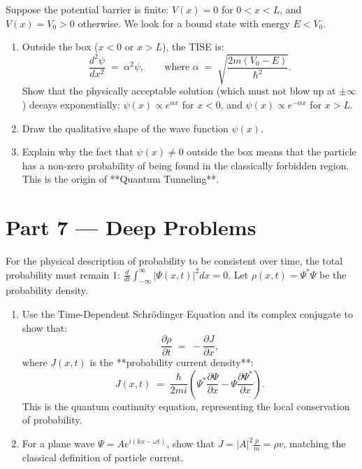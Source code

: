 \documentclass[12pt, a4paper, twoside]{book}
\newcounter{problem}[chapter]
\begin{document}
\begin{problem}
Suppose the potential barrier is finite: $V(x) = 0$ for $0 < x < L$, and $V(x) = V_0 > 0$ otherwise. We look for a bound state with energy $E < V_0$.
\begin{enumerate}[label=(\alph*)]
  \item Outside the box ($x < 0$ or $x > L$), the TISE is:
  \[
    \frac{d^2 \psi}{dx^2} \;=\; \alpha^2 \psi, \qquad \text{where } \alpha \;=\; \sqrt{\frac{2m(V_0 - E)}{\hbar^2}}.
  \]
  Show that the physically acceptable solution (which must not blow up at $\pm\infty$) decays exponentially: $\psi(x) \propto e^{\alpha x}$ for $x < 0$, and $\psi(x) \propto e^{-\alpha x}$ for $x > L$.
  \item Draw the qualitative shape of the wave function $\psi(x)$.
  \item Explain why the fact that $\psi(x) \neq 0$ outside the box means that the particle has a non-zero probability of being found in the classically forbidden region. This is the origin of **Quantum Tunneling**.
\end{enumerate}
\end{problem}

\newpage

\section{Part 7 --- Deep Problems}

\begin{deepproblem}
For the physical description of probability to be consistent over time, the total probability must remain 1: $\frac{d}{dt} \int_{-\infty}^\infty |\Psi(x, t)|^2 dx = 0$.
Let $\rho(x, t) = \Psi^* \Psi$ be the probability density.
\begin{enumerate}[label=(\alph*)]
  \item Use the Time-Dependent Schrödinger Equation and its complex conjugate to show that:
  \[
    \frac{\partial \rho}{\partial t} \;=\; -\frac{\partial J}{\partial x},
  \]
  where $J(x, t)$ is the **probability current density**:
  \[
    J(x, t) \;=\; \frac{\hbar}{2m i} \left( \Psi^* \frac{\partial \Psi}{\partial x} - \Psi \frac{\partial \Psi^*}{\partial x} \right).
  \]
  This is the quantum continuity equation, representing the local conservation of probability.
  \item For a plane wave $\Psi = A e^{i(kx - \omega t)}$, show that $J = |A|^2 \frac{p}{m} = \rho v$, matching the classical definition of particle current.
\end{enumerate}
\end{deepproblem}
\end{document}
